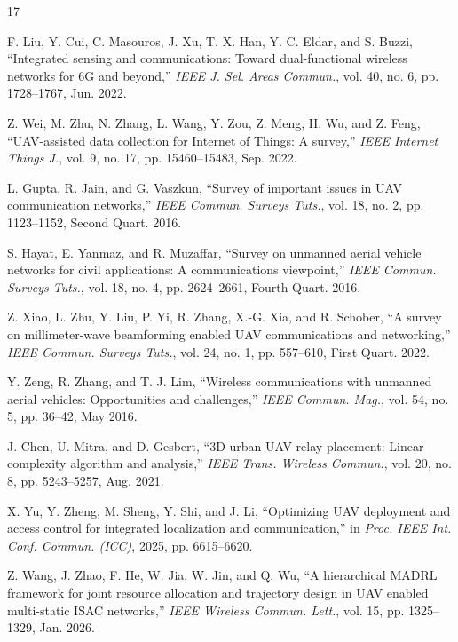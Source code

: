 \documentclass[lettersize,journal]{IEEEtran}
\begin{document}
\begin{thebibliography}{17}



F. Liu, Y. Cui, C. Masouros, J. Xu, T. X. Han, Y. C. Eldar, and S. Buzzi, ``Integrated sensing and communications: Toward dual-functional wireless networks for 6G and beyond,'' \emph{IEEE J. Sel. Areas Commun.}, vol. 40, no. 6, pp. 1728--1767, Jun. 2022.

Z. Wei, M. Zhu, N. Zhang, L. Wang, Y. Zou, Z. Meng, H. Wu, and Z. Feng, ``UAV-assisted data collection for Internet of Things: A survey,'' \emph{IEEE Internet Things J.}, vol. 9, no. 17, pp. 15460--15483, Sep. 2022.

L. Gupta, R. Jain, and G. Vaszkun, ``Survey of important issues in UAV communication networks,'' \emph{IEEE Commun. Surveys Tuts.}, vol. 18, no. 2, pp. 1123--1152, Second Quart. 2016.

S. Hayat, E. Yanmaz, and R. Muzaffar, ``Survey on unmanned aerial vehicle networks for civil applications: A communications viewpoint,'' \emph{IEEE Commun. Surveys Tuts.}, vol. 18, no. 4, pp. 2624--2661, Fourth Quart. 2016.

Z. Xiao, L. Zhu, Y. Liu, P. Yi, R. Zhang, X.-G. Xia, and R. Schober, ``A survey on millimeter-wave beamforming enabled UAV communications and networking,'' \emph{IEEE Commun. Surveys Tuts.}, vol. 24, no. 1, pp. 557--610, First Quart. 2022.

Y. Zeng, R. Zhang, and T. J. Lim, ``Wireless communications with unmanned aerial vehicles: Opportunities and challenges,'' \emph{IEEE Commun. Mag.}, vol. 54, no. 5, pp. 36--42, May 2016.

J. Chen, U. Mitra, and D. Gesbert, ``3D urban UAV relay placement: Linear complexity algorithm and analysis,'' \emph{IEEE Trans. Wireless Commun.}, vol. 20, no. 8, pp. 5243--5257, Aug. 2021.

X. Yu, Y. Zheng, M. Sheng, Y. Shi, and J. Li, ``Optimizing UAV deployment and access control for integrated localization and communication,'' in \emph{Proc. IEEE Int. Conf. Commun. (ICC)}, 2025, pp. 6615--6620.

Z. Wang, J. Zhao, F. He, W. Jia, W. Jin, and Q. Wu, ``A hierarchical MADRL framework for joint resource allocation and trajectory design in UAV enabled multi-static ISAC networks,'' \emph{IEEE Wireless Commun. Lett.}, vol. 15, pp. 1325--1329, Jan. 2026.


\end{thebibliography}
\end{document}
